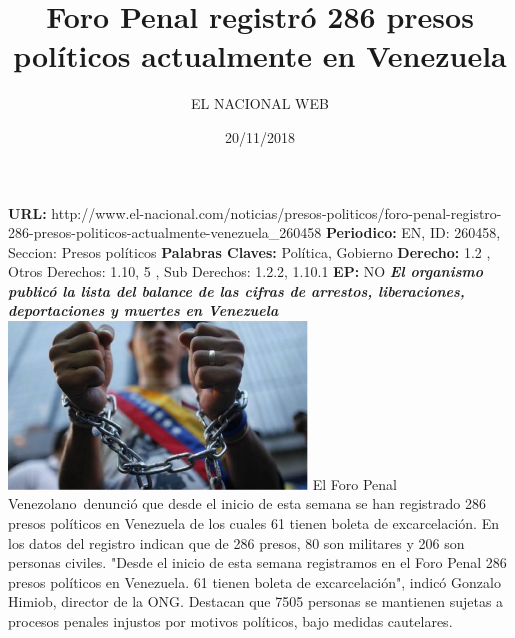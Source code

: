 \documentclass{article}%
\title{\textbf{Foro Penal registró 286 presos políticos actualmente en Venezuela}}%
\author{EL NACIONAL WEB}%
\date{20/11/2018}%
\begin{document}
%
\normalsize%
\maketitle%
\textbf{URL: }%
http://www.el{-}nacional.com/noticias/presos{-}politicos/foro{-}penal{-}registro{-}286{-}presos{-}politicos{-}actualmente{-}venezuela\_260458\newline%
%
\textbf{Periodico: }%
EN, %
ID: %
260458, %
Seccion: %
Presos políticos\newline%
%
\textbf{Palabras Claves: }%
Política, Gobierno\newline%
%
\textbf{Derecho: }%
1.2%
, Otros Derechos: %
1.10, 5%
, Sub Derechos: %
1.2.2, 1.10.1%
\newline%
%
\textbf{EP: }%
NO\newline%
\newline%
%
\textbf{\textit{El organismo publicó la lista del balance de las cifras de arrestos, liberaciones, deportaciones y muertes en Venezuela}}%
\newline%
\newline%
%
\includegraphics[width=300px]{195.jpg}%
\newline%
%
El Foro Penal Venezolano~denunció que desde el inicio de esta semana se han registrado 286 presos políticos en Venezuela de los cuales 61 tienen boleta de excarcelación.%
\newline%
%
En los datos del registro indican que de 286 presos, 80 son militares y 206 son personas civiles. "Desde el inicio de esta semana registramos en el Foro Penal 286 presos políticos en Venezuela. 61 tienen boleta de excarcelación", indicó Gonzalo Himiob, director de la ONG.%
\newline%
%
Destacan que 7505 personas se mantienen sujetas a procesos penales injustos por motivos políticos, bajo medidas cautelares.%
\newline%
%
\end{document}
